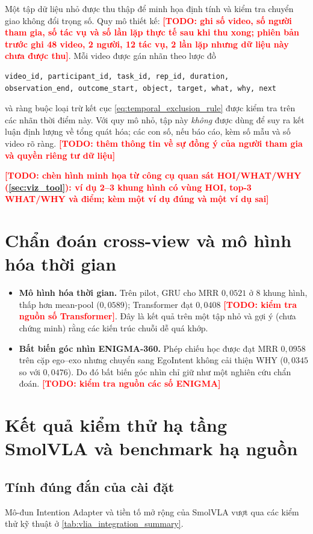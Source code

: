 \documentclass[12pt,a4paper]{report}
\newcommand{\TODO}[1]{\textcolor{red}{\textbf{[TODO: #1]}}}
\begin{document}
Một tập dữ liệu nhỏ được thu thập để minh họa định tính và kiểm tra chuyển giao không đổi trọng số. Quy mô thiết kế: \TODO{ghi số video, số người tham gia, số tác vụ và số lần lặp thực tế sau khi thu xong; phiên bản trước ghi 48 video, 2 người, 12 tác vụ, 2 lần lặp nhưng dữ liệu này chưa được thu}. Mỗi video được gán nhãn theo lược đồ
\begin{verbatim}
video_id, participant_id, task_id, rep_id, duration,
observation_end, outcome_start, object, target, what, why, next
\end{verbatim}
và ràng buộc loại trừ kết cục \cref{eq:temporal_exclusion_rule} được kiểm tra trên các nhãn thời điểm này. Với quy mô nhỏ, tập này \emph{không} được dùng để suy ra kết luận định lượng về tổng quát hóa; các con số, nếu báo cáo, kèm số mẫu và số video rõ ràng. \TODO{thêm thông tin về sự đồng ý của người tham gia và quyền riêng tư dữ liệu}

\TODO{chèn hình minh họa từ công cụ quan sát HOI/WHAT/WHY (\cref{sec:viz_tool}): ví dụ 2--3 khung hình có vùng HOI, top-3 WHAT/WHY và điểm; kèm một ví dụ đúng và một ví dụ sai}

\section{Chẩn đoán cross-view và mô hình hóa thời gian}

\begin{itemize}
    \item \textbf{Mô hình hóa thời gian.} Trên pilot, GRU cho MRR $0{,}0521$ ở 8 khung hình, thấp hơn mean-pool ($0{,}0589$); Transformer đạt $0{,}0408$ \TODO{kiểm tra nguồn số Transformer}. Đây là kết quả trên một tập nhỏ và gợi ý (chưa chứng minh) rằng các kiến trúc chuỗi dễ quá khớp.
    \item \textbf{Bất biến góc nhìn ENIGMA-360.} Phép chiếu học được đạt MRR $0{,}0958$ trên cặp ego--exo nhưng chuyển sang EgoIntent không cải thiện WHY ($0{,}0345$ so với $0{,}0476$). Do đó bất biến góc nhìn chỉ giữ như một nghiên cứu chẩn đoán. \TODO{kiểm tra nguồn các số ENIGMA}
\end{itemize}

\section{Kết quả kiểm thử hạ tầng SmolVLA và benchmark hạ nguồn}

\subsection{Tính đúng đắn của cài đặt}
Mô-đun Intention Adapter và tiền tố mở rộng của SmolVLA vượt qua các kiểm thử kỹ thuật ở \cref{tab:vlia_integration_summary}.
\end{document}

